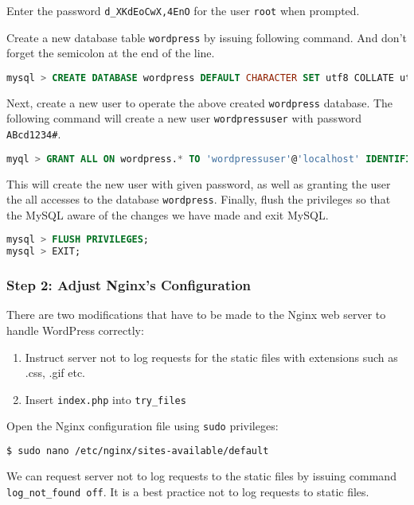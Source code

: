 Enter the password \texttt{d\_XKdEoCwX,4EnO} for the user \texttt{root} when prompted.

Create a new database table \texttt{wordpress} by issuing following command. And don't forget the semicolon at the end of the line.
\begin{lstlisting}[language=SQL]
mysql > CREATE DATABASE wordpress DEFAULT CHARACTER SET utf8 COLLATE utf8_unicode_ci;
\end{lstlisting}

Next, create a new user to operate the above created \texttt{wordpress} database. The following command will create a new user \texttt{wordpressuser} with password \texttt{ABcd1234\#}.

\begin{lstlisting}[language=SQL]
myql > GRANT ALL ON wordpress.* TO 'wordpressuser'@'localhost' IDENTIFIED BY 'ABcd1234#';
\end{lstlisting}

This will create the new user with given password, as well as granting the user the all accesses to the database \texttt{wordpress}. Finally, flush the privileges so that the MySQL aware of the changes we have made and exit MySQL.

\begin{lstlisting}[language=SQL]
mysql > FLUSH PRIVILEGES;
mysql > EXIT;
\end{lstlisting}


\subsubsection*{Step 2: Adjust Nginx's Configuration}
There are two modifications that have to be made to the Nginx web server to handle WordPress correctly:
\begin{enumerate}
\item Instruct server not to log requests for the static files with extensions such as .css, .gif etc.
\item Insert \texttt{index.php} into \texttt{try\_files}
\end{enumerate}

Open the Nginx configuration file using \texttt{sudo} privileges:
\begin{lstlisting}[language=sh]
$ sudo nano /etc/nginx/sites-available/default
\end{lstlisting}

We can request server not to log requests to the static files by issuing command {\tt log\_not\_found off}. It is a best practice not to log requests to static files.

